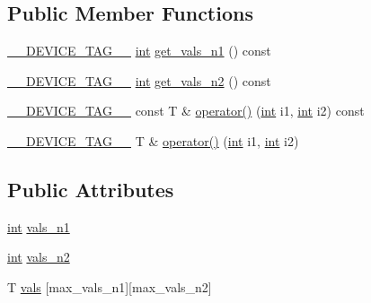 \subsection*{Public Member Functions}
\begin{DoxyCompactItemize}
\item 
\hyperlink{scalar__traits_8h_a2396f3e69fc9792ad01b8b14a1a425e3}{\-\_\-\-\_\-\-D\-E\-V\-I\-C\-E\-\_\-\-T\-A\-G\-\_\-\-\_\-} \hyperlink{classint}{int} \hyperlink{structutils_1_1vals__table__2d_ac5a239db5117ccfe3c620184261f16f2}{get\-\_\-vals\-\_\-n1} () const 
\item 
\hyperlink{scalar__traits_8h_a2396f3e69fc9792ad01b8b14a1a425e3}{\-\_\-\-\_\-\-D\-E\-V\-I\-C\-E\-\_\-\-T\-A\-G\-\_\-\-\_\-} \hyperlink{classint}{int} \hyperlink{structutils_1_1vals__table__2d_a8e3ed22e657e3598b3bc7b5fc407aa44}{get\-\_\-vals\-\_\-n2} () const 
\item 
\hyperlink{scalar__traits_8h_a2396f3e69fc9792ad01b8b14a1a425e3}{\-\_\-\-\_\-\-D\-E\-V\-I\-C\-E\-\_\-\-T\-A\-G\-\_\-\-\_\-} const T \& \hyperlink{structutils_1_1vals__table__2d_a0d6e463b69ba3b69a802afbb8a85ae06}{operator()} (\hyperlink{classint}{int} i1, \hyperlink{classint}{int} i2) const 
\item 
\hyperlink{scalar__traits_8h_a2396f3e69fc9792ad01b8b14a1a425e3}{\-\_\-\-\_\-\-D\-E\-V\-I\-C\-E\-\_\-\-T\-A\-G\-\_\-\-\_\-} T \& \hyperlink{structutils_1_1vals__table__2d_a534e52200136f3cbb7a1b94c4168ac93}{operator()} (\hyperlink{classint}{int} i1, \hyperlink{classint}{int} i2)
\end{DoxyCompactItemize}
\subsection*{Public Attributes}
\begin{DoxyCompactItemize}
\item 
\hyperlink{classint}{int} \hyperlink{structutils_1_1vals__table__2d_a842f3a4304ebee55a51807eaa2d875ed}{vals\-\_\-n1}
\item 
\hyperlink{classint}{int} \hyperlink{structutils_1_1vals__table__2d_acb7d1fe6f6b1a9e9fffac100c0496e0f}{vals\-\_\-n2}
\item 
T \hyperlink{structutils_1_1vals__table__2d_aa019454355b7fbdf9d0c35b035a94c5c}{vals} \mbox{[}max\-\_\-vals\-\_\-n1\mbox{]}\mbox{[}max\-\_\-vals\-\_\-n2\mbox{]}
\end{DoxyCompactItemize}



